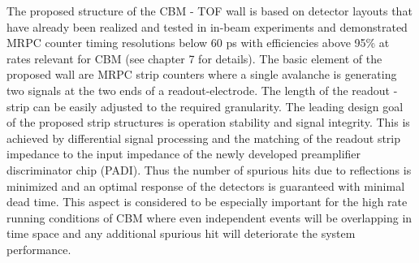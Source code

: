 The proposed structure of the CBM - TOF wall is based on detector layouts that have already been
realized and tested in in-beam experiments and demonstrated MRPC counter timing resolutions below
60 ps with efficiencies above 95\% at rates relevant for CBM (see chapter 7 for details). The basic element
of the proposed wall are MRPC strip counters where a single avalanche is generating two signals at
the two ends of a readout-electrode. The length of the readout - strip can be easily adjusted to the
required granularity. The leading design goal of the proposed strip structures is operation stability and
signal integrity. This is achieved by differential signal processing and the matching of the readout strip
impedance to the input impedance of the newly developed preamplifier discriminator chip (PADI). Thus
the number of spurious hits due to reflections is minimized and an optimal response of the detectors is
guaranteed with minimal dead time. This aspect is considered to be especially important for the high
rate running conditions of CBM where even independent events will be overlapping in time space and
any additional spurious hit will deteriorate the system performance.


